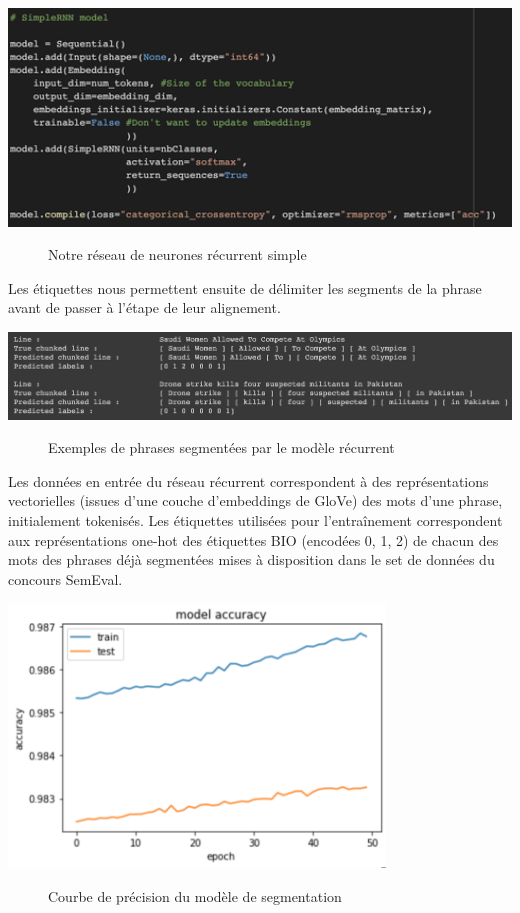 \documentclass[a4paper, twoside, 11pt]{article}
\begin{document}
  \begin{center}
 \includegraphics[width=14cm,angle=0]{modele.png}
\begin{figure}[!h]
\caption{Notre réseau de neurones récurrent simple}
\end{figure}
 \end{center}

 Les étiquettes nous permettent ensuite de délimiter les segments de la phrase avant de passer à l’étape de leur alignement.

  \begin{center}
 \includegraphics[width=14cm,angle=0]{chunks.png}
\begin{figure}[!h]
\caption{Exemples de phrases segmentées par le modèle récurrent}
\end{figure}
 \end{center}

Les données en entrée du réseau récurrent correspondent à des représentations vectorielles (issues d’une couche d’embeddings de GloVe) des mots d’une phrase, initialement tokenisés. Les étiquettes utilisées pour l'entraînement correspondent aux représentations \og one-hot  \fg{} des étiquettes BIO (encodées 0, 1, 2) de chacun des mots des phrases déjà segmentées mises à disposition dans le set de données du concours SemEval.

   \begin{center}
 \includegraphics[width=10cm,angle=0]{accuracy.png}
\begin{figure}[!h]
\caption{Courbe de précision du modèle de segmentation}
\end{figure}
 \end{center}
\end{document}
